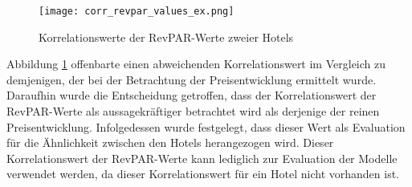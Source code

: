 \begin{figure}[h]
    \centering
    \texttt{[image: corr\_revpar\_values\_ex.png]}
    \caption[Korrelationswerte der RevPAR-Werte zweier Hotels]{Korrelationswerte der RevPAR-Werte zweier Hotels}
    \label{img:corr_revpar_values_ex}
\end{figure}

Abbildung \ref{img:corr_revpar_values_ex} offenbarte einen abweichenden Korrelationswert im Vergleich zu demjenigen, der bei der Betrachtung der Preisentwicklung ermittelt wurde. Daraufhin wurde die Entscheidung getroffen, dass der Korrelationswert der RevPAR-Werte als aussagekräftiger betrachtet wird als derjenige der reinen Preisentwicklung. Infolgedessen wurde festgelegt, dass dieser Wert als Evaluation für die Ähnlichkeit zwischen den Hotels herangezogen wird.
\newline
\newline
Dieser Korrelationswert der RevPAR-Werte kann lediglich zur Evaluation der Modelle verwendet werden, da dieser Korrelationswert für ein Hotel nicht vorhanden ist. 